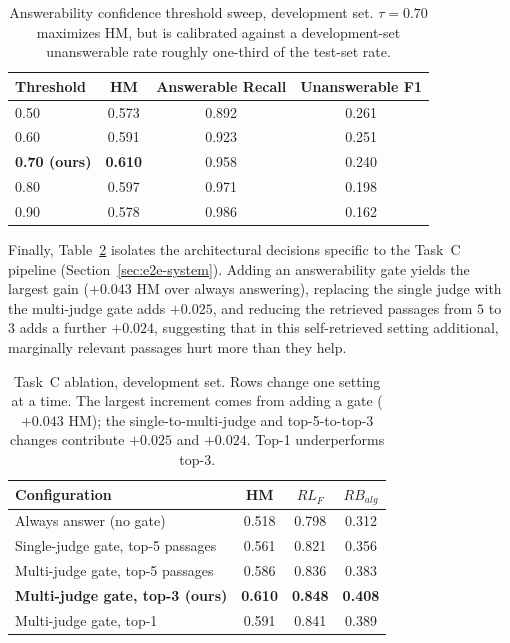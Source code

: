 \begin{table}[h]
\centering
\small
\begin{tabular}{lccc}
\toprule
\textbf{Threshold} & \textbf{HM} & \textbf{Answerable Recall} & \textbf{Unanswerable F1} \\
\midrule
0.50 & 0.573 & 0.892 & 0.261 \\
0.60 & 0.591 & 0.923 & 0.251 \\
\textbf{0.70 (ours)} & \textbf{0.610} & 0.958 & 0.240 \\
0.80 & 0.597 & 0.971 & 0.198 \\
0.90 & 0.578 & 0.986 & 0.162 \\
\bottomrule
\end{tabular}
\caption{Answerability confidence threshold sweep, development set. $\tau{=}0.70$ maximizes HM, but is calibrated against a development-set unanswerable rate roughly one-third of the test-set rate.}
\label{tab:threshold-sweep-en}
\end{table}

Finally, Table~\ref{tab:taskC-ablation-en} isolates the architectural decisions specific to the Task~C pipeline (Section~\ref{sec:e2e-system}). Adding an answerability gate yields the largest gain ($+0.043$ HM over always answering), replacing the single judge with the multi-judge gate adds $+0.025$, and reducing the retrieved passages from $5$ to $3$ adds a further $+0.024$, suggesting that in this self-retrieved setting additional, marginally relevant passages hurt more than they help.

\begin{table}[h]
\centering
\small
\begin{tabular}{lccc}
\toprule
\textbf{Configuration} & \textbf{HM} & \textbf{$RL_F$} & \textbf{$RB_{alg}$} \\
\midrule
Always answer (no gate) & 0.518 & 0.798 & 0.312 \\
Single-judge gate, top-5 passages & 0.561 & 0.821 & 0.356 \\
Multi-judge gate, top-5 passages & 0.586 & 0.836 & 0.383 \\
\textbf{Multi-judge gate, top-3 (ours)} & \textbf{0.610} & \textbf{0.848} & \textbf{0.408} \\
Multi-judge gate, top-1 & 0.591 & 0.841 & 0.389 \\
\bottomrule
\end{tabular}
\caption{Task~C ablation, development set. Rows change one setting at a time. The largest increment comes from adding a gate ($+0.043$ HM); the single-to-multi-judge and top-5-to-top-3 changes contribute $+0.025$ and $+0.024$. Top-1 underperforms top-3.}
\label{tab:taskC-ablation-en}
\end{table}

